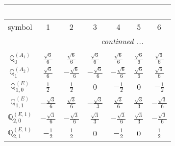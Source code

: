 \documentclass[fleqn,10pt,landscape]{article}
\begin{document}
\begin{itemize}
{\begin{center}
\begin{longtable}{ccccccc}
\multicolumn{6}{l}{\tablename\ \thetable{}} \\
 \hline \hline
symbol & 1 & 2 & 3 & 4 & 5 & 6 \\ \hline \endhead

 \hline \hline
\multicolumn{6}{r}{\footnotesize\it continued ...} \\ \endfoot

 \hline \hline
\multicolumn{6}{r}{} \\ \endlastfoot

$\mathbb{Q}_{0}^{(A_{1})}$ & $ \frac{\sqrt{6}}{6} $ & $ \frac{\sqrt{6}}{6} $ & $ \frac{\sqrt{6}}{6} $ & $ \frac{\sqrt{6}}{6} $ & $ \frac{\sqrt{6}}{6} $ & $ \frac{\sqrt{6}}{6} $ \\ \hline
$\mathbb{Q}_{1}^{(A_{2})}$ & $ \frac{\sqrt{6}}{6} $ & $ - \frac{\sqrt{6}}{6} $ & $ - \frac{\sqrt{6}}{6} $ & $ - \frac{\sqrt{6}}{6} $ & $ \frac{\sqrt{6}}{6} $ & $ \frac{\sqrt{6}}{6} $ \\ \hline
$\mathbb{Q}_{1,0}^{(E)}$ & $ \frac{1}{2} $ & $ \frac{1}{2} $ & $ 0 $ & $ - \frac{1}{2} $ & $ 0 $ & $ - \frac{1}{2} $ \\ \hline
$\mathbb{Q}_{1,1}^{(E)}$ & $ - \frac{\sqrt{3}}{6} $ & $ \frac{\sqrt{3}}{6} $ & $ - \frac{\sqrt{3}}{3} $ & $ \frac{\sqrt{3}}{6} $ & $ \frac{\sqrt{3}}{3} $ & $ - \frac{\sqrt{3}}{6} $ \\ \hline
$\mathbb{Q}_{2,0}^{(E,1)}$ & $ - \frac{\sqrt{3}}{6} $ & $ - \frac{\sqrt{3}}{6} $ & $ \frac{\sqrt{3}}{3} $ & $ - \frac{\sqrt{3}}{6} $ & $ \frac{\sqrt{3}}{3} $ & $ - \frac{\sqrt{3}}{6} $ \\ \hline
$\mathbb{Q}_{2,1}^{(E,1)}$ & $ - \frac{1}{2} $ & $ \frac{1}{2} $ & $ 0 $ & $ - \frac{1}{2} $ & $ 0 $ & $ \frac{1}{2} $ \\
\end{longtable}
\end{center}
}
\end{itemize}
\end{document}
